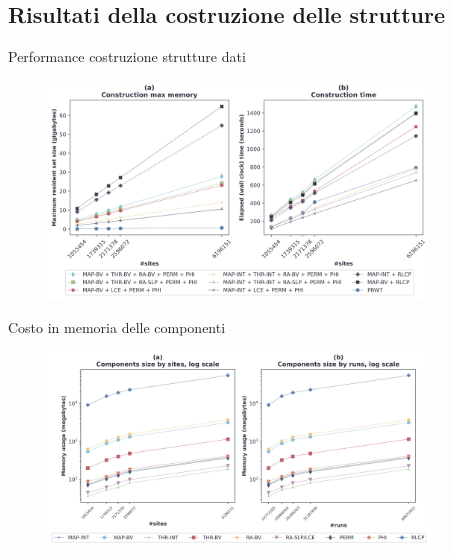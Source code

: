 \documentclass[]{beamer}
\begin{document}
\subsection{Risultati della costruzione delle strutture}
\begin{frame}{Performance costruzione strutture dati}
  \begin{figure}[H]
    \centering
    \includegraphics[width=0.9\textwidth]{img/make_time_mem_paper.png}
  \end{figure}
\end{frame}
\begin{frame}{Costo in memoria delle componenti}
  \begin{figure}[H]
    \centering
    \includegraphics[width=0.9\textwidth]{img/comp_mem.png}
  \end{figure}
\end{frame}
\end{document}
